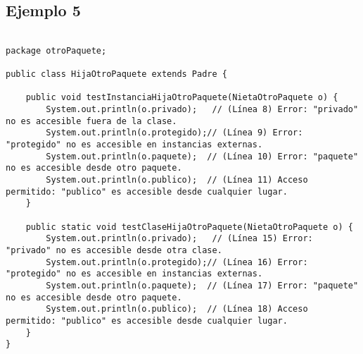 \documentclass[a4paper,12pt]{article}
\begin{document}
\subsection{Ejemplo 5}
\begin{lstlisting}[style=customjava]

package otroPaquete;

public class HijaOtroPaquete extends Padre {

    public void testInstanciaHijaOtroPaquete(NietaOtroPaquete o) {
        System.out.println(o.privado);   // (Línea 8) Error: "privado" no es accesible fuera de la clase.
        System.out.println(o.protegido);// (Línea 9) Error: "protegido" no es accesible en instancias externas.
        System.out.println(o.paquete);  // (Línea 10) Error: "paquete" no es accesible desde otro paquete.
        System.out.println(o.publico);  // (Línea 11) Acceso permitido: "publico" es accesible desde cualquier lugar.
    }

    public static void testClaseHijaOtroPaquete(NietaOtroPaquete o) {
        System.out.println(o.privado);   // (Línea 15) Error: "privado" no es accesible desde otra clase.
        System.out.println(o.protegido);// (Línea 16) Error: "protegido" no es accesible en instancias externas.
        System.out.println(o.paquete);  // (Línea 17) Error: "paquete" no es accesible desde otro paquete.
        System.out.println(o.publico);  // (Línea 18) Acceso permitido: "publico" es accesible desde cualquier lugar.
    }
}
\end{lstlisting}
    




























    
    
\end{document}
